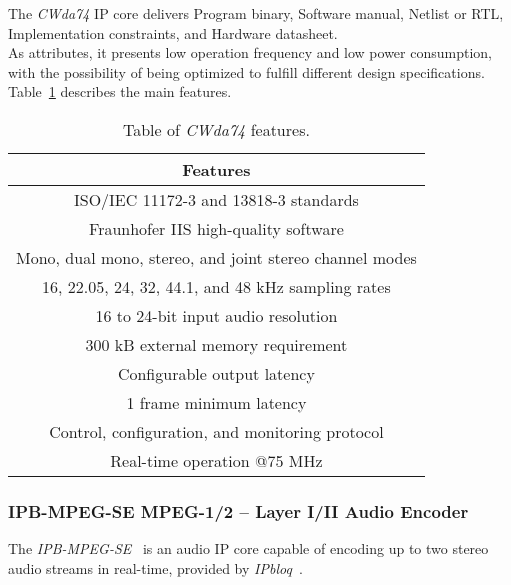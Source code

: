 The \textit{CWda74} IP core delivers Program binary, Software manual, Netlist or RTL, Implementation constraints, and Hardware datasheet.\\
As attributes, it presents low operation frequency and low power consumption, with the possibility of being optimized to fulfill different design specifications.
Table~\ref{tab:coreworks} describes the main features.

\vspace{0.5cm}

\begin{table}[h]
    \centering
    \begin{tabular}{|c|}
        \hline
        \textbf{Features} \\
        \hline
         ISO/IEC 11172-3 and 13818-3 standards \\
         \hline
         Fraunhofer IIS high-quality software\\
         \hline
         Mono, dual mono, stereo, and joint stereo channel modes \\
         \hline
         16, 22.05, 24, 32, 44.1, and 48 kHz sampling rates \\
         \hline
         16 to 24-bit input audio resolution \\
         \hline
         300 kB external memory requirement\\
         \hline
         Configurable output latency \\
         \hline
         1 frame minimum latency\\
         \hline
         Control, configuration, and monitoring protocol \\
         \hline
         Real-time operation @75 MHz \\
         \hline
    \end{tabular}
    \caption{Table of \textit{CWda74} features.}
    \label{tab:coreworks}
\end{table}

\vspace{0.5cm}

\subsubsection{IPB-MPEG-SE MPEG-1/2 – Layer I/II Audio Encoder}

The \textit{IPB-MPEG-SE}~\cite{ipb-mpeg-se} is an audio IP core capable of encoding up to two stereo audio streams in real-time, provided by \textit{IPbloq}~\cite{ipbloq}.

